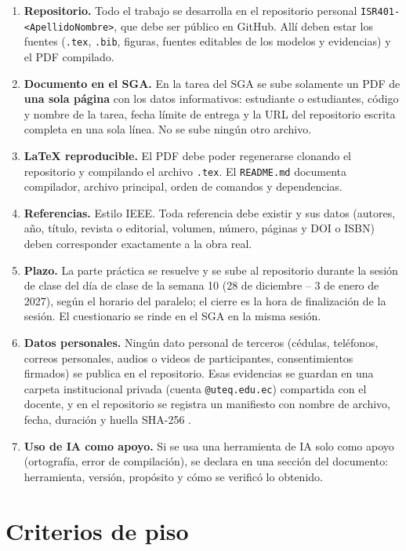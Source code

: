 \documentclass[11pt]{article}
\newcommand{\seccion}[1]{\section{\textcolor{utegreendk}{#1}}}
\begin{document}
\begin{enumerate}[leftmargin=20pt,itemsep=3pt]
	\item \textbf{Repositorio.} Todo el trabajo se desarrolla en el repositorio personal \texttt{ISR401-<ApellidoNombre>}, que debe ser público en GitHub. Allí deben estar los fuentes (\texttt{.tex}, \texttt{.bib}, figuras, fuentes editables de los modelos y evidencias) y el PDF compilado.
	\item \textbf{Documento en el SGA.} En la tarea del SGA se sube solamente un PDF de \textbf{una sola página} con los datos informativos: estudiante o estudiantes, código y nombre de la tarea, fecha límite de entrega y la URL del repositorio escrita completa en una sola línea. No se sube ningún otro archivo.
	\item \textbf{\LaTeX{} reproducible.} El PDF debe poder regenerarse clonando el repositorio y compilando el archivo \texttt{.tex}. El \texttt{README.md} documenta compilador, archivo principal, orden de comandos y dependencias.
	\item \textbf{Referencias.} Estilo IEEE. Toda referencia debe existir y sus datos (autores, año, título, revista o editorial, volumen, número, páginas y DOI o ISBN) deben corresponder exactamente a la obra real.
	\item \textbf{Plazo.} La parte práctica se resuelve y se sube al repositorio durante la sesión de clase del día de clase de la semana 10 (28 de diciembre -- 3 de enero de 2027), según el horario del paralelo; el cierre es la hora de finalización de la sesión. El cuestionario se rinde en el SGA en la misma sesión.
	\item \textbf{Datos personales.} Ningún dato personal de terceros (cédulas, teléfonos, correos personales, audios o videos de participantes, consentimientos firmados) se publica en el repositorio. Esas evidencias se guardan en una carpeta institucional privada (cuenta \texttt{@uteq.edu.ec}) compartida con el docente, y en el repositorio se registra un manifiesto con nombre de archivo, fecha, duración y huella SHA-256 \citep{lopdp_2021}.
	\item \textbf{Uso de IA como apoyo.} Si se usa una herramienta de IA solo como apoyo (ortografía, error de compilación), se declara en una sección del documento: herramienta, versión, propósito y cómo se verificó lo obtenido.
\end{enumerate}

\seccion{Criterios de piso}
\end{document}
